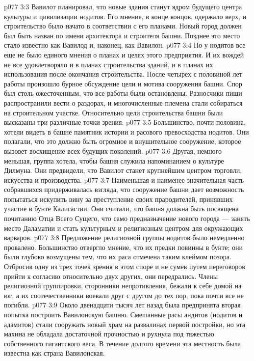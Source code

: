 \vs p077 3:3 Вавилот планировал, что новые здания станут ядром будущего центра культуры и цивилизации нодитов. Его мнение, в конце концов, одержало верх, и строительство было начато в соответствии с его планами. Новый город должен был быть назван  по имени архитектора и строителя башни. Позднее это место стало известно как Вавилод и, наконец, как Вавилон.
\vs p077 3:4 Но у нодитов все еще не было единого мнения о планах и целях этого предприятия. И их вождей не все удовлетворяло и в планах строительства зданий, и в планах их использования после окончания строительства. После четырех с половиной лет работы произошло бурное обсуждение цели и мотива сооружения башни. Спор был столь ожесточенным, что все работы были остановлены. Разносчики пищи распространили вести о раздорах, и многочисленные племена стали собираться на строительном участке. Относительно цели строительства башни были высказаны три различные точки зрения:
\vs p077 3:5 \bibnobreakspace Большинство, почти половина, хотели видеть в башне памятник истории и расового превосходства нодитов. Они полагали, что это должно быть огромное и внушительное сооружение, которое вызовет восхищение всех будущих поколений.
\vs p077 3:6 \bibnobreakspace Другая, немного меньшая, группа хотела, чтобы башня служила напоминанием о культуре Дилмуна. Они предвидели, что Вавилот станет крупнейшим центром торговли, искусства и производства.
\vs p077 3:7 \bibnobreakspace Наименьшая и наименее значительная часть собравшихся придерживалась взгляда, что сооружение башни дает возможность попытаться искупить вину за преступление своих прародителей, принявших участие в бунте Калигастии. Они считали, что башня должна быть посвящена почитанию Отца Всего Сущего, что само предназначение нового города --- занять место Даламатии и стать культурным и религиозным центром для окружающих варваров.
\vs p077 3:8 \pc Предложение религиозной группы нодитов было немедленно провалено. Большинство отвергло мнение, что их предки повинны в бунте; они были глубоко возмущены тем, что их раса отмечена таким клеймом позора. Отбросив одну из трех точек зрения в этом споре и не сумев путем переговоров прийти к согласию относительно двух других, они передрались. Члены религиозной группировки, сторонники непротивления, бежали к себе домой на юг, а их соотечественники воевали друг с другом до тех пор, пока почти все не погибли.
\vs p077 3:9 \pc Около двенадцати тысяч лет назад была предпринята вторая попытка построить Вавилонскую башню. Смешанные расы андитов (нодитов и адамитов) стали сооружать новый храм на развалинах первой постройки, но эта махина не обладала достаточной прочностью и рухнула под тяжестью собственного гигантского веса. В течение долгого времени эта местность была известна как страна Вавилонская.
